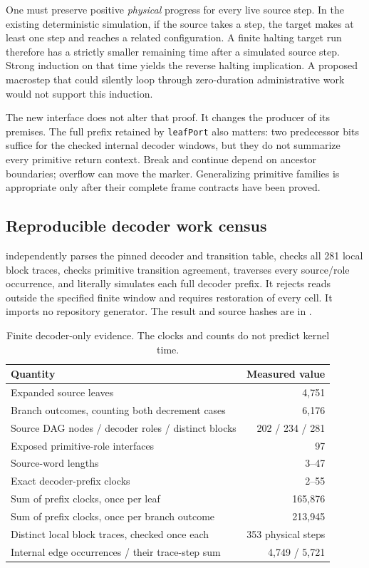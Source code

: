 \documentclass[11pt,letterpaper]{article}
\newcommand{\code}[1]{\texttt{\small #1}}
\begin{document}
One must preserve positive \emph{physical} progress for every live source step. In the
existing deterministic simulation, if the source takes a step, the target makes at
least one step and reaches a related configuration. A finite halting target run
therefore has a strictly smaller remaining time after a simulated source step.
Strong induction on that time yields the reverse halting implication. A proposed
macrostep that could silently loop through zero-duration administrative work would
not support this induction.

The new interface does not alter that proof. It changes the producer of its premises.
The full prefix retained by \code{leafPort} also matters: two predecessor bits suffice
for the checked internal decoder windows, but they do not summarize every primitive
return context. Break and continue depend on ancestor boundaries; overflow can move
the marker. Generalizing primitive families is appropriate only after their complete
frame contracts have been proved.

\subsection{Reproducible decoder work census}

 independently parses the pinned decoder and
transition table, checks all 281 local block traces, checks primitive transition
agreement, traverses every source/role occurrence, and literally simulates each full
decoder prefix. It rejects reads outside the specified finite window and requires
restoration of every cell. It imports no repository generator. The result and source
hashes are in .

\begin{table}[ht]
\centering\small
\begin{tabular}{@{}lr@{}}
\toprule
Quantity & Measured value\\
\midrule
Expanded source leaves & 4,751\\
Branch outcomes, counting both decrement cases & 6,176\\
Source DAG nodes / decoder roles / distinct blocks & 202 / 234 / 281\\
Exposed primitive-role interfaces & 97\\
Source-word lengths & 3--47\\
Exact decoder-prefix clocks & 2--55\\
Sum of prefix clocks, once per leaf & 165,876\\
Sum of prefix clocks, once per branch outcome & 213,945\\
Distinct local block traces, checked once each & 353 physical steps\\
Internal edge occurrences / their trace-step sum & 4,749 / 5,721\\
\bottomrule
\end{tabular}
\caption{Finite decoder-only evidence. The clocks and counts do not predict kernel time.}
\end{table}
\end{document}
